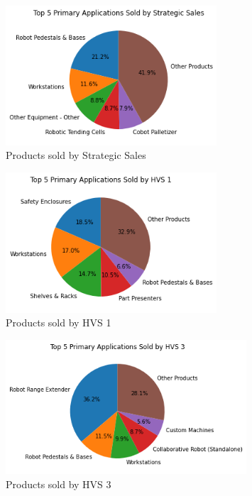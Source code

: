 \documentclass[]{report}
\begin{document}
\begin{figure}[htb]
	\centering
	\includegraphics[width=0.70\textwidth]{fig_03_strategic_sales}
	\caption{Products sold by Strategic Sales}
	\label{fig:fig_03a}
\end{figure}

\begin{figure}[htb]
	\centering
	\includegraphics[width=0.70\textwidth]{fig_03_hvs_1}
	\caption{Products sold by HVS 1}
	\label{fig:fig_03b}
\end{figure}

\begin{figure}[htb]
	\centering
	\includegraphics[width=0.80\textwidth]{fig_03_hvs_3}
	\caption{Products sold by HVS 3}
	\label{fig:fig_03c}
\end{figure}
\end{document}
